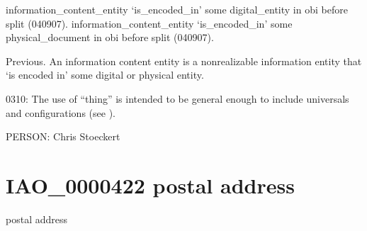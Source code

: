 \documentclass[letterpaper,10pt,english]{sphinxmanual}
\begin{document}
\begin{sphinxShadowBox}

\sphinxAtStartPar
information\_content\_entity ‘is\_encoded\_in’ some digital\_entity in obi before split (040907). information\_content\_entity ‘is\_encoded\_in’ some physical\_document in obi before split (040907).

\sphinxAtStartPar
Previous. An information content entity is a non\sphinxhyphen{}realizable information entity that ‘is encoded in’ some digital or physical entity.

\sphinxhyphen{}03\sphinxhyphen{}10: The use of “thing” is intended to be general enough to include universals and configurations (see ).
\end{sphinxShadowBox}

\begin{sphinxShadowBox}

\sphinxAtStartPar
{}
\end{sphinxShadowBox}

\begin{sphinxShadowBox}

\sphinxAtStartPar
PERSON: Chris Stoeckert
\end{sphinxShadowBox}
\begin{quote}
\label{\detokenize{doc-IAO_0000422:iao-0000422}}\label{\detokenize{doc-IAO_0000422:postal-address}}\label{\detokenize{doc-IAO_0000422:iao-0000422}}
\ignorespaces \end{quote}


\section{IAO\_0000422 \sphinxhyphen{} postal address}
\label{\detokenize{doc-IAO_0000422:iao-0000422-postal-address}}\label{\detokenize{doc-IAO_0000422:index-0}}\label{\detokenize{doc-IAO_0000422::doc}}
\begin{sphinxShadowBox}

\sphinxAtStartPar
postal address
\end{sphinxShadowBox}
\end{document}
